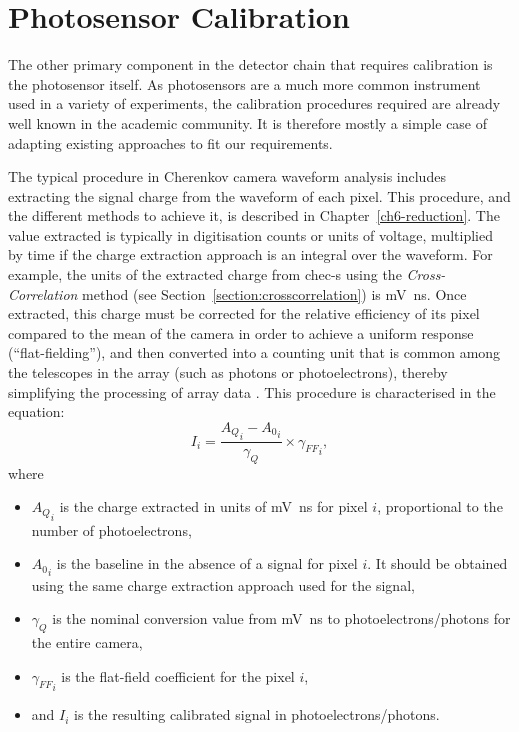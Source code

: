 \section{Photosensor Calibration} \label{section:photosensor_calib}

The other primary component in the detector chain that requires calibration is the photosensor itself. As photosensors are a much more common instrument used in a variety of experiments, the calibration procedures required are already well known in the academic community. It is therefore mostly a simple case of adapting existing approaches to fit our requirements.

The typical procedure in Cherenkov camera waveform analysis includes extracting the signal charge from the waveform of each pixel. This procedure, and the different methods to achieve it, is described in Chapter~\ref{ch6-reduction}. The value extracted is typically in digitisation counts or units of voltage, multiplied by time if the charge extraction approach is an integral over the waveform. For example, the units of the extracted charge from \gls{chec-s} using the \textit{Cross-Correlation} method (see Section~\ref{section:crosscorrelation}) is \si{mV ns}. Once extracted, this charge must be corrected for the relative efficiency of its pixel compared to the mean of the camera in order to achieve a uniform response (``flat-fielding''), and then converted into a counting unit that is common among the telescopes in the array (such as photons or photoelectrons), thereby simplifying the processing of array data \cite{Aharonian2004}. This procedure is characterised in the equation: 
\begin{equation} \label{eq:photosensor_calibration}
I_i = \frac{{A_Q}_i - {A_0}_i}{\gamma_{Q}} \times {\gamma_{FF}}_i,
\end{equation}
where 
\begin{itemize}
\item ${A_Q}_i$ is the charge extracted in units of \si{mV ns} for pixel $i$, proportional to the number of photoelectrons,
\item ${A_0}_i$ is the baseline in the absence of a signal for pixel $i$. It should be obtained using the same charge extraction approach used for the signal,
\item $\gamma_{Q}$ is the nominal conversion value from \si{mV ns} to photoelectrons/photons for the entire camera,
\item ${\gamma_{FF}}_i$ is the flat-field coefficient for the pixel $i$,
\item and $I_i$ is the resulting calibrated signal in photoelectrons/photons.
\end{itemize}

